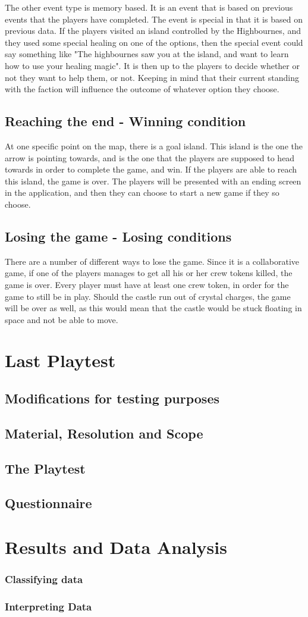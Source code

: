 The other event type is memory based. It is an event that is based on previous events that the players have completed. The event is special in that it is based on previous data. If the players visited an island controlled by the Highbournes, and they used some special healing on one of the options, then the special event could say something like "The highbournes saw you at the island, and want to learn how to use your healing magic". It is then up to the players to decide whether or not they want to help them, or not. Keeping in mind that their current standing with the faction will influence the outcome of whatever option they choose. 

\subsection{Reaching the end - Winning condition}
At one specific point on the map, there is a goal island. This island is the one the arrow is pointing towards, and is the one that the players are supposed to head towards in order to complete the game, and win.
If the players are able to reach this island, the game is over. The players will be presented with an ending screen in the application, and then they can choose to start a new game if they so choose. 

\subsection{Losing the game - Losing conditions}
There are a number of different ways to lose the game. Since it is a collaborative game, if one of the players manages to get all his or her crew tokens killed, the game is over. Every player must have at least one crew token, in order for the game to still be in play.
Should the castle run out of crystal charges, the game will be over as well, as this would mean that the castle would be stuck floating in space and not be able to move.

\section{Last Playtest}
\subsection{Modifications for testing purposes}
\subsection{Material, Resolution and Scope}
\subsection{The Playtest}
\subsection{Questionnaire}

\section{Results and Data Analysis}
\subsubsection{Classifying data}
\subsubsection{Interpreting Data}